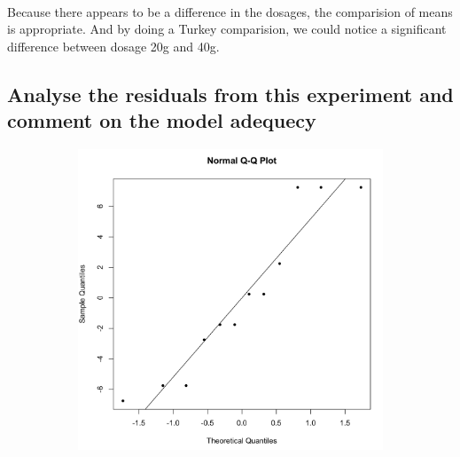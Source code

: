 \documentclass[11pt]{article}
\begin{document}


\paragraph{}
Because there appears to be a difference in the dosages, the comparision of means is appropriate.
And by doing a Turkey comparision, we could notice a significant
difference between dosage 20g and 40g.

\subsection{Analyse the residuals from this experiment and comment on the model adequecy}

\begin{figure}[H]
    \centering
    \begin{subfigure}{0.45\textwidth}
        \includegraphics[width=\textwidth]{../pictures/hw2_q2_qq.png}
    \end{subfigure}
    \begin{subfigure}{0.45\textwidth}

\end{subfigure}
\end{figure}
\end{document}
